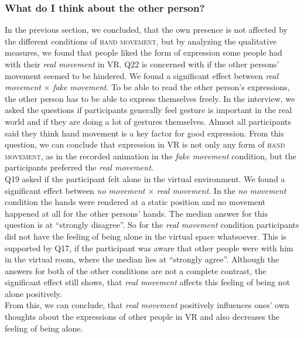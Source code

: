 \documentclass[english,runningheads,a4paper]{llncs}[2018/03/10]
\begin{document}
\subsubsection{What do I think about the other person?}
In the previous section, we concluded, that the own presence is not affected by the different conditions of \textsc{hand movement}, but by analyzing the qualitative measures, we found that people liked the form of expression some people had with their \textit{real movement} in VR.
Q22 is concerned with if the other persons' movement seemed to be hindered. 
We found a significant effect between \textit{real movement} $\times$ \textit{fake movement}.
To be able to read the other person's expressions, the other person has to be able to express themselves freely.
In the interview, we asked the questions if participants generally feel gesture is important in the real world and if they are doing a lot of gestures themselves. 
Almost all participants said they think hand movement is a key factor for good expression. 
From this question, we can conclude that expression in VR is not only any form of \textsc{hand movement}, as in the recorded animation in the \textit{fake movement} condition, but the participants preferred the \textit{real movement}. \\ \linebreak
Q19 asked if the participant felt alone in the virtual environment.
We found a significant effect between \textit{no movement} $\times$ \textit{real movement}.
In the \textit{no movement} condition the hands were rendered at a static position and no movement happened at all for the other persons' hands.
The median answer for this question is at ``strongly disagree''.
So for the \textit{real movement} condition participants did not have the feeling of being alone in the virtual space whatsoever. 
This is supported by Q17, if the participant was aware that other people were with him in the virtual room, where the median lies at ``strongly agree''.
Although the answers for both of the other conditions are not a complete contrast, the significant effect still shows, that \textit{real movement} affects this feeling of being not alone positively. \\ \linebreak
From this, we can conclude, that \textit{real movement} positively influences ones' own thoughts about the expressions of other people in VR and also decreases the feeling of being alone. 

\end{document}
